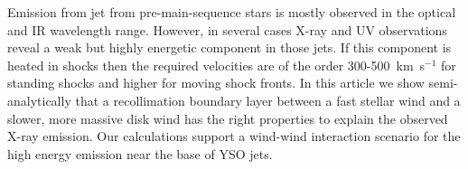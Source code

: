 Emission from jet from pre-main-sequence stars is mostly observed in the optical and IR wavelength range. However, in several cases X-ray and UV observations reveal a weak but highly energetic component in those jets. If this component is heated in shocks then the required velocities are of the order 300-500~km~s$^{-1}$ for standing shocks and higher for moving shock fronts. In this article we show semi-analytically that a recollimation boundary layer between a fast stellar wind and a slower, more massive disk wind has the right properties to explain the observed X-ray emission. Our calculations support a wind-wind interaction scenario for the high energy emission near the base of YSO jets. 
